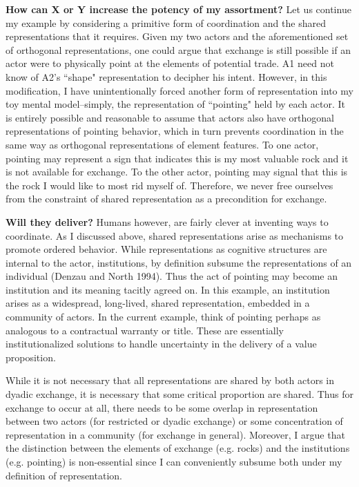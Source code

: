\textbf{How can X or Y increase the potency of my assortment?}
Let us continue my example by considering a primitive form of coordination and the shared representations that it requires. Given my two actors and the aforementioned set of orthogonal representations, one could argue that exchange is still possible if an actor were to physically point at the elements of potential trade. A1 need not know of A2's ``shape" representation to decipher his intent. However, in this modification, I have unintentionally forced another form of representation into my toy mental model--simply, the representation of ``pointing" held by each actor. It is entirely possible and reasonable to assume that actors also have orthogonal representations of pointing behavior, which in turn prevents coordination in the same way as orthogonal representations of element features. To one actor, pointing may represent a sign that indicates this is my most valuable rock and it is not available for exchange. To the other actor, pointing may signal that this is the rock I would like to most rid myself of. Therefore, we never free ourselves from the constraint of shared representation as a precondition for exchange. 

\textbf{Will they deliver?}
Humans however, are fairly clever at inventing ways to coordinate. As I discussed above, shared representations arise as mechanisms to promote ordered behavior. While representations as cognitive structures are internal to the actor, institutions, by definition subsume the representations of an individual (Denzau and North 1994). Thus the act of pointing may become an institution and its meaning tacitly agreed on. In this example, an institution arises as a widespread, long-lived, shared representation, embedded in a community of actors. In the current example, think of pointing perhaps as analogous to a contractual warranty or title. These are essentially institutionalized solutions to handle uncertainty in the delivery of a value proposition. 

While it is not necessary that all representations are shared by both actors in dyadic exchange, it is necessary that some critical proportion are shared. Thus for exchange to occur at all, there needs to be some overlap in representation between two actors (for restricted or dyadic exchange) or some concentration of representation in a community (for exchange in general). Moreover, I argue that the distinction between the elements of exchange (e.g. rocks) and the institutions (e.g. pointing) is non-essential since I can conveniently subsume both under my definition of representation. 

